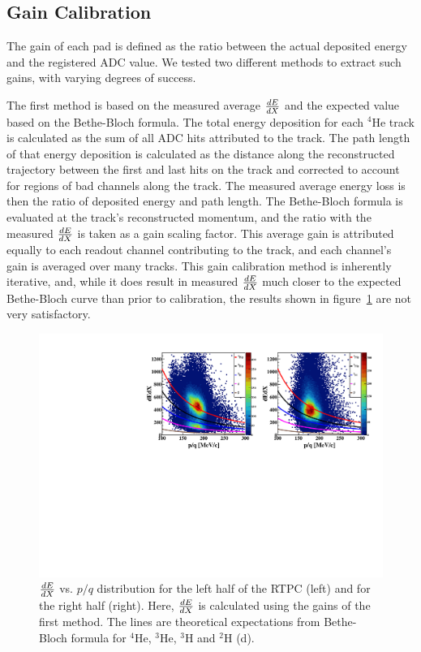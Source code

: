 \documentclass[twocolumn,showpacs,superscriptaddress,groupedaddress]{revtex4}
\begin{document}
\subsection{Gain Calibration}

The gain of each pad is defined as the ratio between the actual 
deposited energy and the registered ADC value. We tested two different 
methods to extract such gains, with varying degrees of success.

The first method is based on the measured average $\small{\frac{dE}{dX}}$
and the expected value based on the Bethe-Bloch formula. The total energy
deposition for each $^4$He track is calculated as the sum of all ADC hits
attributed to the track. The path length of that energy deposition is
calculated as the distance along the reconstructed trajectory between the first
and last hits on the track and corrected to account for regions
of bad channels along the track. The measured average energy loss is then the
ratio of deposited energy and path length. The Bethe-Bloch formula is
evaluated at the track's reconstructed momentum, and the ratio with the measured
$\small{\frac{dE}{dX}}$ is taken as a gain scaling factor. This average gain is
attributed equally to each readout channel contributing to the track, and each
channel's gain is averaged over many tracks. This gain calibration method is
inherently iterative, and, while it does result in measured $\small{\frac{dE}{dX}}$
much closer to the expected Bethe-Bloch curve than prior to calibration, the
results shown in figure~\ref{fig:dedx_p_exp_1st} are not very satisfactory.

\begin{figure}[tb]
   \centering
   \includegraphics[scale=0.43]{fig_2017/f_dedx_p_exp_1st.pdf}
   \caption{$\small{\frac{dE}{dX}}$ vs. $p/q$ distribution for the left half of 
      the RTPC (left) and for the right half (right). Here, 
      $\small{\frac{dE}{dX}}$ is calculated using the gains of the first 
      method.  The lines are theoretical expectations from Bethe-Bloch formula 
   for $^4$He, $^3$He, $^3$H and $^2$H (d).}
\label{fig:dedx_p_exp_1st}
\end{figure}
\end{document}
